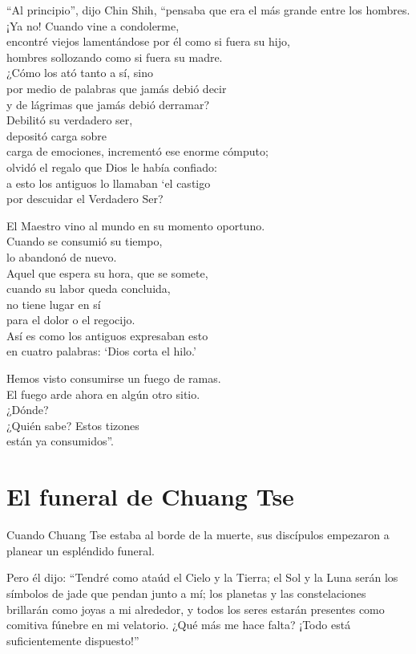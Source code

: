 \documentclass[book,b5paper,hidelinks,final]{memoir}
\begin{document}
	``Al principio'', dijo Chin Shih, ``pensaba que era el más grande entre
	los hombres.\\
	¡Ya no! Cuando vine a condolerme,\\
	encontré viejos lamentándose por él como si fuera su hijo,\\
	hombres sollozando como si fuera su madre.\\
	¿Cómo los ató tanto a sí, sino\\
	por medio de palabras que jamás debió decir\\
	y de lágrimas que jamás debió derramar?\\
	Debilitó su verdadero ser,\\
	depositó carga sobre\\
	carga de emociones, incrementó ese enorme cómputo;\\
	olvidó el regalo que Dios le había confiado:\\
	a esto los antiguos lo llamaban `el castigo\\
	por descuidar el Verdadero Ser?
	
	El Maestro vino al mundo en su momento oportuno.\\
	Cuando se consumió su tiempo,\\
	lo abandonó de nuevo.\\
	Aquel que espera su hora, que se somete,\\
	cuando su labor queda concluida,\\
	no tiene lugar en sí\\
	para el dolor o el regocijo.\\
	Así es como los antiguos expresaban esto\\
	en cuatro palabras: `Dios corta el hilo.'
	
	Hemos visto consumirse un fuego de ramas.\\
	El fuego arde ahora en algún otro sitio.\\
	¿Dónde?\\
	¿Quién sabe? Estos tizones\\
	están ya consumidos''.
	
	\chapter*{El funeral de Chuang Tse}
	
	Cuando Chuang Tse estaba al borde de la muerte, sus discípulos empezaron
	a planear un espléndido funeral.
	
	Pero él dijo: ``Tendré como ataúd el Cielo y la Tierra; el Sol y la Luna
	serán los símbolos de jade que pendan junto a mí; los planetas y las
	constelaciones brillarán como joyas a mi alrededor, y todos los seres
	estarán presentes como comitiva fúnebre en mi velatorio. ¿Qué más me
	hace falta? ¡Todo está suficientemente dispuesto!''
	
\end{document}
